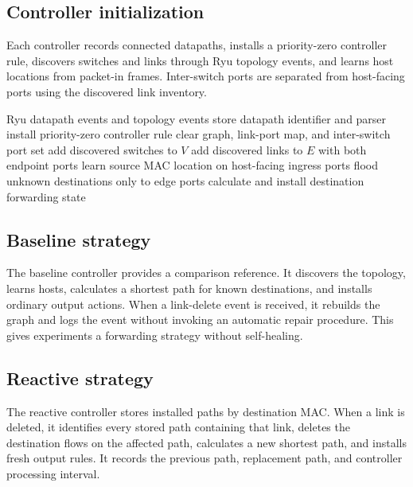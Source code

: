 \documentclass[conference]{IEEEtran}
\begin{document}
\subsection{Controller initialization}

Each controller records connected datapaths, installs a priority-zero
controller rule, discovers switches and links through Ryu topology events, and
learns host locations from packet-in frames. Inter-switch ports are separated
from host-facing ports using the discovered link inventory.

\begin{algorithm}
\caption{Topology discovery and forwarding setup}
\label{alg:setup}
\begin{algorithmic}[1]
\Require Ryu datapath events and topology events
  \State store datapath identifier and parser
  \State install priority-zero controller rule
\EndFor
{}
  \State clear graph, link-port map, and inter-switch port set
  \State add discovered switches to $V$
  \State add discovered links to $E$ with both endpoint ports
\EndFor
{}
  \State learn source MAC location on host-facing ingress ports
  \State flood unknown destinations only to edge ports
  \State calculate and install destination forwarding state
\EndFor
\end{algorithmic}
\end{algorithm}

\subsection{Baseline strategy}

The baseline controller provides a comparison reference. It discovers the
topology, learns hosts, calculates a shortest path for known destinations, and
installs ordinary output actions. When a link-delete event is received, it
rebuilds the graph and logs the event without invoking an automatic repair
procedure. This gives experiments a forwarding strategy without self-healing.

\subsection{Reactive strategy}

The reactive controller stores installed paths by destination MAC. When a link
is deleted, it identifies every stored path containing that link, deletes the
destination flows on the affected path, calculates a new shortest path, and
installs fresh output rules. It records the previous path, replacement path,
and controller processing interval.
\end{document}
